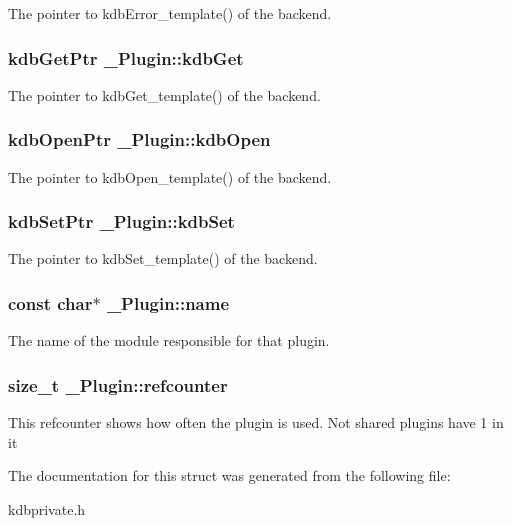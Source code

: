 \label{struct__Plugin_a621683acebfa6aac91c5903d8f6d653a}
The pointer to kdbError\_\-template() of the backend. \hypertarget{struct__Plugin_a0b2e0db2565e6f1d16f9b78112580a18}{
\subsubsection[{kdbGet}]{\setlength{\rightskip}{0pt plus 5cm}kdbGetPtr {\bf \_\-Plugin::kdbGet}}}
\label{struct__Plugin_a0b2e0db2565e6f1d16f9b78112580a18}
The pointer to kdbGet\_\-template() of the backend. \hypertarget{struct__Plugin_ac9da7168ac65402b997a31a3b4a8d720}{
\subsubsection[{kdbOpen}]{\setlength{\rightskip}{0pt plus 5cm}kdbOpenPtr {\bf \_\-Plugin::kdbOpen}}}
\label{struct__Plugin_ac9da7168ac65402b997a31a3b4a8d720}
The pointer to kdbOpen\_\-template() of the backend. \hypertarget{struct__Plugin_acaa373d251ec25ff93335741ddb5b0e3}{
\subsubsection[{kdbSet}]{\setlength{\rightskip}{0pt plus 5cm}kdbSetPtr {\bf \_\-Plugin::kdbSet}}}
\label{struct__Plugin_acaa373d251ec25ff93335741ddb5b0e3}
The pointer to kdbSet\_\-template() of the backend. \hypertarget{struct__Plugin_ad3ca225d725b5ae7b46754c025007a75}{
\subsubsection[{name}]{\setlength{\rightskip}{0pt plus 5cm}const char$\ast$ {\bf \_\-Plugin::name}}}
\label{struct__Plugin_ad3ca225d725b5ae7b46754c025007a75}
The name of the module responsible for that plugin. \hypertarget{struct__Plugin_a9be13e52b86cb351edd25a143d186da3}{
\subsubsection[{refcounter}]{\setlength{\rightskip}{0pt plus 5cm}size\_\-t {\bf \_\-Plugin::refcounter}}}
\label{struct__Plugin_a9be13e52b86cb351edd25a143d186da3}
This refcounter shows how often the plugin is used. Not shared plugins have 1 in it 

The documentation for this struct was generated from the following file:\begin{DoxyCompactItemize}
\item 
kdbprivate.h\end{DoxyCompactItemize}
